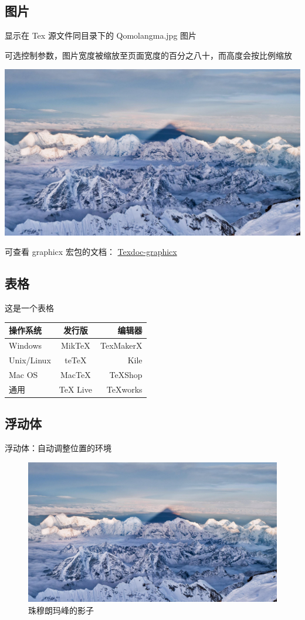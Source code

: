 \documentclass[UTF8]{ctexart}
\begin{document}
    \subsection{图片}
    显示在 Tex 源文件同目录下的 Qomolangma.jpg 图片
    
    可选控制参数，图片宽度被缩放至页面宽度的百分之八十，而高度会按比例缩放

    \includegraphics[width = .8\textwidth]{Qomolangma.jpg}

    可查看 graphicx 宏包的文档： \href{https://texdoc.org/serve/graphicx.pdf/0}{Texdoc-graphicx}

    \subsection{表格}
    这是一个表格

    \begin{tabular}{|l|c|r|}
         \hline
        操作系统& 发行版& 编辑器\\
        \hline
        Windows & MikTeX & TexMakerX \\
        \hline
        Unix/Linux & teTeX & Kile \\
        \hline
        Mac OS & MacTeX & TeXShop \\
        \hline
        通用& TeX Live & TeXworks \\
        \hline
    \end{tabular}

    \subsection{浮动体}
    浮动体：自动调整位置的环境

    \begin{figure}[htbp]
        \centering
        \includegraphics[width = .5\textwidth]{Qomolangma.jpg}
        \caption{珠穆朗玛峰的影子}
        \label{fig::Qomolangma}
    \end{figure}
\end{document}
